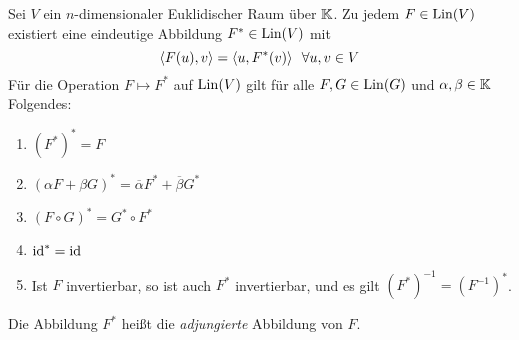 \begin{thm}
	Sei $ V $ ein $ n $-dimensionaler Euklidischer Raum über $ \mathbb K $. Zu jedem $ F \in \operatorname{Lin}(V) $ existiert eine eindeutige Abbildung $ F^\ast \in \operatorname{Lin}(V) $ mit
	\begin{equation}
		\left\langle F(u),v \right\rangle = \left\langle u,F^\ast(v) \right\rangle \enspace \forall u,v \in V
		\label{eq:7_2_1:ast}
	\end{equation}
	Für die Operation $ F \mapsto F^\ast $ auf $\operatorname{Lin}(V)$ gilt für alle $F, G \in \operatorname{Lin}(G)$ und  $\alpha, \beta \in \mathbb K$ Folgendes:
	\begin{enumerate}
		\item
			$ (F^\ast)^\ast = F$
		\item
			$ (\alpha F + \beta G)^\ast = \overline{\alpha} F^\ast + \overline{\beta} G^\ast$
		\item
			$ (F \circ G)^\ast = G^\ast \circ F^\ast$
		\item
			$ \operatorname{id}^\ast = \operatorname{id} $
		\item
			Ist $ F$ invertierbar, so ist auch $ F^\ast $ invertierbar, und es gilt $ (F^\ast)^{-1} = (F^{-1})^\ast $.
	\end{enumerate}
	Die Abbildung $ F^\ast $ heißt die \emph{adjungierte} Abbildung von $ F $.
\end{thm}
